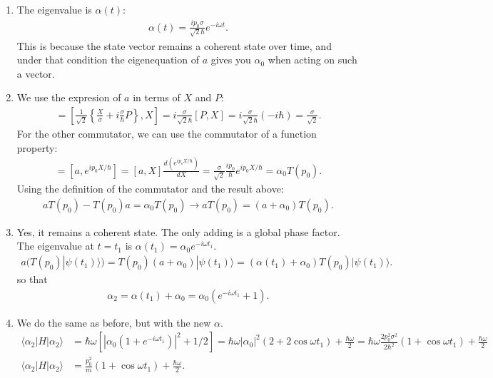 \documentclass[letterpaper,11pt,twoside]{article}
\newcommand{\ket}[1]{|#1\rangle}
\newcommand{\braket}[1]{\langle#1\rangle}
\begin{document}
\begin{enumerate}[itemsep=0pt,topsep=0pt,label=\alph*)]
  \item The eigenvalue is $\alpha(t)$:
  \begin{align*}
    \alpha(t)=\frac{ip_0\sigma}{\sqrt{2}\hbar}e^{-i\omega t}.
  \end{align*}
  This is because the state vector remains a coherent state over time, and under that condition the eigenequation of $a$ gives you $\alpha_0$ when acting on such a vector.
  \item We use the expresion of $a$ in terms of $X$ and $P$:
  \begin{align*}
    [a,X]=\left[\frac{1}{\sqrt{2}}\left\{\frac{X}{\sigma}+i\frac{\sigma}{\hbar}P\right\},X\right]=i\frac{\sigma}{\sqrt{2}\hbar}[P,X]=i\frac{\sigma}{\sqrt{2}\hbar}(-i\hbar)=\frac{\sigma}{\sqrt{2}}.
  \end{align*}
  For the other commutator, we can use the commutator of a function property:
  \begin{align*}
    [a,T(p_0)]=[a,e^{ip_0X/\hbar}]=[a,X]\frac{d(e^{ip_oX/\hbar})}{dX}=\frac{\sigma}{\sqrt{2}}\frac{ip_0}{\hbar}e^{ip_0X/\hbar}=\alpha_0T(p_0).
  \end{align*}
  Using the definition of the commutator and the result above:
  \begin{align*}
    aT(p_0)-T(p_0)a=\alpha_0T(p_0)\longrightarrow aT(p_0)=(a+\alpha_0)T(p_0).
  \end{align*}
  \item Yes, it remains a coherent state. The only adding is a global phase factor. The eigenvalue at $t=t_1$ is $\alpha(t_1)=\alpha_0e^{-i\omega t_1}$.
  \begin{align*}
    a(T(p_0)\ket{\psi(t_1)})=T(p_0)(a+\alpha_0)\ket{\psi(t_1)}=(\alpha(t_1)+\alpha_0)T(p_0)\ket{\psi(t_1)}.
  \end{align*}
  so that 
  \begin{align*}
    \alpha_2=\alpha(t_1)+\alpha_0=\alpha_0(e^{-i\omega t_1}+1).
  \end{align*}
  \item We do the same as before, but with the new $\alpha$.
  \begin{align*}
    \braket{\alpha_2|H|\alpha_2}&=\hbar\omega\left[|\alpha_0(1+e^{-i\omega t_1})|^2+1/2\right]=\hbar\omega|\alpha_0|^2(2+2\cos\omega t_1)+\frac{\hbar\omega}{2}=\hbar\omega\frac{2p_0^2\sigma^2}{2\hbar^2}(1+\cos\omega t_1)+\frac{\hbar\omega}{2}\\
    \braket{\alpha_2|H|\alpha_2}&=\frac{p_0^2}{m}(1+\cos\omega t_1)+\frac{\hbar\omega}{2}.
  \end{align*}

\end{enumerate}
\end{document}
